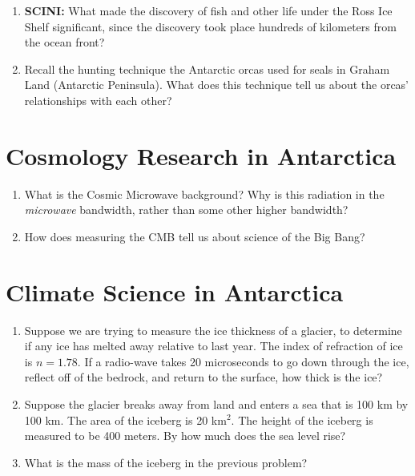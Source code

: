 \documentclass[10pt]{article}
\begin{document}
\begin{enumerate}
\item \textbf{SCINI:} What made the discovery of fish and other life under the Ross Ice Shelf significant, since the discovery took place hundreds of kilometers from the ocean front? \\ \vspace{2cm}
\item Recall the hunting technique the Antarctic orcas used for seals in Graham Land (Antarctic Peninsula).  What does this technique tell us about the orcas' relationships with each other? \\ \vspace{2cm}

\end{enumerate}

\section{Cosmology Research in Antarctica}

\begin{enumerate}
\item What is the Cosmic Microwave background?  Why is this radiation in the \textit{microwave} bandwidth, rather than some other higher bandwidth? \\ \vspace{2cm}
\item How does measuring the CMB tell us about science of the Big Bang? \\ \vspace{2cm}
\end{enumerate}

\section{Climate Science in Antarctica}

\begin{enumerate}
\item Suppose we are trying to measure the ice thickness of a glacier, to determine if any ice has melted away relative to last year.  The index of refraction of ice is $n = 1.78$.  If a radio-wave takes 20 microseconds to go down through the ice, reflect off of the bedrock, and return to the surface, how thick is the ice? \\ \vspace{2cm}
\item Suppose the glacier breaks away from land and enters a sea that is 100 km by 100 km.  The area of the iceberg is 20 km$^2$.  The height of the iceberg is measured to be 400 meters.  By how much does the sea level rise? \\ \vspace{2cm}
\item What is the mass of the iceberg in the previous problem?
\end{enumerate}
\end{document}
